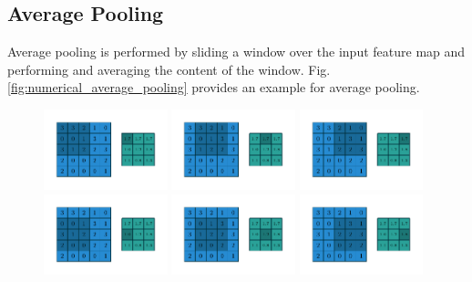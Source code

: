 \subsection{Average Pooling}
Average pooling is performed by sliding a window over the input feature map and performing and averaging the content of the window. Fig. \ref{fig:numerical_average_pooling}
provides an example for average pooling.
\begin{figure}
    \centering
    \includegraphics[width=0.32\textwidth]{pdf/numerical_average_pooling_00.pdf}
    \includegraphics[width=0.32\textwidth]{pdf/numerical_average_pooling_01.pdf}
    \includegraphics[width=0.32\textwidth]{pdf/numerical_average_pooling_02.pdf}
    \includegraphics[width=0.32\textwidth]{pdf/numerical_average_pooling_03.pdf}
    \includegraphics[width=0.32\textwidth]{pdf/numerical_average_pooling_04.pdf}
    \includegraphics[width=0.32\textwidth]{pdf/numerical_average_pooling_05.pdf}

\end{figure}
